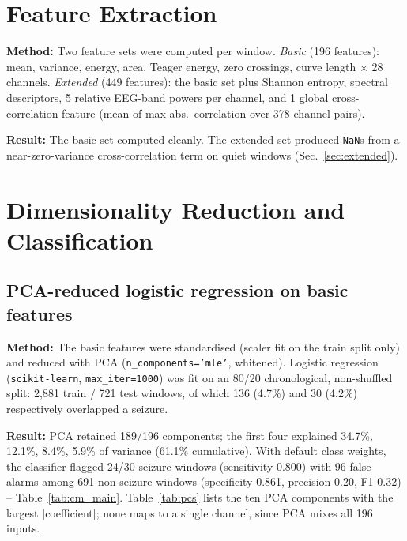 ﻿\documentclass[a4paper,10pt]{article}
\begin{document}
\section{Feature Extraction}
\label{sec:features}

\textbf{Method:} Two feature sets were computed per window. \textit{Basic} (196 features): mean, variance, energy, area, Teager energy, zero crossings, curve length $\times$ 28 channels. \textit{Extended} (449 features): the basic set plus Shannon entropy, spectral descriptors, 5 relative EEG-band powers per channel, and 1 global cross-correlation feature (mean of max abs.\ correlation over 378 channel pairs).

\textbf{Result:} The basic set computed cleanly. The extended set produced \texttt{NaN}s from a near-zero-variance cross-correlation term on quiet windows (Sec.~\ref{sec:extended}).

\section{Dimensionality Reduction and Classification}
\label{sec:classification}

\subsection{PCA-reduced logistic regression on basic features}
\label{sec:logreg}

\textbf{Method:} The basic features were standardised (scaler fit on the train split only) and reduced with PCA (\texttt{n\_components='mle'}, whitened). Logistic regression (\texttt{scikit-learn}, \texttt{max\_iter=1000}) was fit on an 80/20 chronological, non-shuffled split: 2{,}881 train / 721 test windows, of which 136 (4.7\%) and 30 (4.2\%) respectively overlapped a seizure.

\textbf{Result:} PCA retained 189/196 components; the first four explained 34.7\%, 12.1\%, 8.4\%, 5.9\% of variance (61.1\% cumulative). With default class weights, the classifier flagged 24/30 seizure windows (sensitivity 0.800) with 96 false alarms among 691 non-seizure windows (specificity 0.861, precision 0.20, F1 0.32) -- Table~\ref{tab:cm_main}. Table~\ref{tab:pcs} lists the ten PCA components with the largest $|$coefficient$|$; none maps to a single channel, since PCA mixes all 196 inputs.
\end{document}
